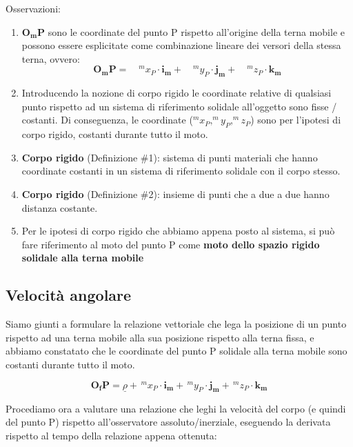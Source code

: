 			Osservazioni: 
			\begin{enumerate}[$\rightarrow$]
				\item $\mathbf{O_mP}$ sono le coordinate del punto P rispetto all'origine della terna mobile e possono essere esplicitate come combinazione lineare dei versori della stessa terna, ovvero:
					\begin{equation*}
						\mathbf{O_mP} = \quad ^mx_P \cdot \mathbf{i_m} +\quad ^my_P \cdot \mathbf{j_m} +\quad ^mz_P \cdot \mathbf{k_m}
					\end{equation*}
				\item Introducendo la nozione di corpo rigido le coordinate relative di qualsiasi punto rispetto ad un sistema di riferimento solidale all'oggetto sono fisse / costanti. Di conseguenza, le coordinate ($ ^m\!x_P, ^m\!y_P, ^m\!z_P$) sono per l'ipotesi di corpo rigido, costanti durante tutto il moto.
				\item \textbf{Corpo rigido} (Definizione \#1): sistema di punti materiali che hanno coordinate costanti in un sistema di riferimento solidale con il corpo stesso.
				\item \textbf{Corpo rigido} (Definizione \#2): insieme di punti che a due a due hanno distanza costante.
				\item Per le ipotesi di corpo rigido che abbiamo appena posto al sistema, si può fare riferimento al moto del punto P come\textbf{ moto dello spazio rigido solidale alla terna mobile}
			\end{enumerate}
		
		\subsection{Velocità angolare}
			Siamo giunti a formulare la relazione vettoriale che lega la posizione di un punto rispetto ad una terna mobile alla sua posizione rispetto alla terna fissa, e abbiamo constatato che le coordinate del punto P solidale alla terna mobile sono costanti durante tutto il moto.
			
				\begin{equation*}
					\mathbf{O_fP} =  \underline{\rho} +  \, ^mx_P \cdot \mathbf{i_m} +\, ^my_P \cdot \mathbf{j_m} +\, ^mz_P \cdot \mathbf{k_m}
				\end{equation*}
		
		Procediamo ora a valutare una relazione che leghi la velocità del corpo (e quindi del punto P) rispetto all'osservatore assoluto/inerziale, eseguendo la derivata rispetto al tempo della relazione appena ottenuta:
		
